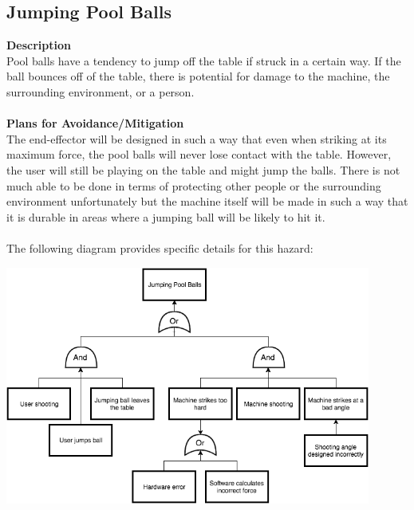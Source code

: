 \documentclass[titlepage]{article}
\begin{document}
\subsection{Jumping Pool Balls}
\textbf{Description}\\
Pool balls have a tendency to jump off the table if struck in a certain way. If the ball bounces off of the table, there is potential for damage to the machine, the surrounding environment, or a person.\\~\\
\textbf{Plans for Avoidance/Mitigation}\\
The end-effector will be designed in such a way that even when striking at its maximum force, the pool balls will never lose contact with the table. However, the user will still be playing on the table and might jump the balls. There is not much able to be done in terms of protecting other people or the surrounding environment unfortunately but the machine itself will be made in such a way that it is durable in areas where a jumping ball will be likely to hit it.\\~\\
The following diagram provides specific details for this hazard:
\begin{center}
	\includegraphics[width=0.9\textwidth]{JumpingBallsFTA.png}
\label{fig:yRailFig}
\end{center}

\newpage
\end{document}
